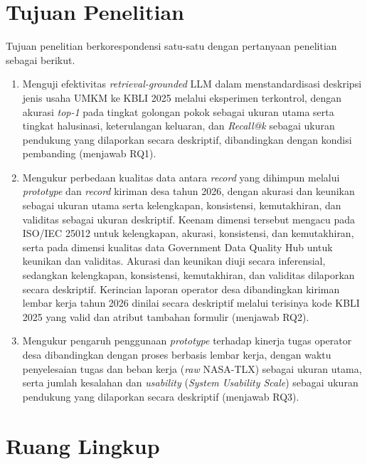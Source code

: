 \section{Tujuan Penelitian}
\label{sec:tujuan}

Tujuan penelitian berkorespondensi satu-satu dengan pertanyaan penelitian sebagai berikut.

\begin{enumerate}[label=\textbf{T\arabic*}:, leftmargin=*]
  \item Menguji efektivitas \textit{retrieval-grounded} LLM dalam menstandardisasi deskripsi jenis usaha UMKM ke KBLI 2025 melalui eksperimen terkontrol, dengan akurasi \textit{top-1} pada tingkat golongan pokok sebagai ukuran utama serta tingkat halusinasi, keterulangan keluaran, dan \textit{Recall@k} sebagai ukuran pendukung yang dilaporkan secara deskriptif, dibandingkan dengan kondisi pembanding (menjawab RQ1).
  \item Mengukur perbedaan kualitas data antara \textit{record} yang dihimpun melalui \textit{prototype} dan \textit{record} kiriman desa tahun 2026, dengan akurasi dan keunikan sebagai ukuran utama serta kelengkapan, konsistensi, kemutakhiran, dan validitas sebagai ukuran deskriptif. Keenam dimensi tersebut mengacu pada ISO/IEC 25012 \cite{iso25012} untuk kelengkapan, akurasi, konsistensi, dan kemutakhiran, serta pada dimensi kualitas data Government Data Quality Hub \cite{govuk2021dqdimensions} untuk keunikan dan validitas. Akurasi dan keunikan diuji secara inferensial, sedangkan kelengkapan, konsistensi, kemutakhiran, dan validitas dilaporkan secara deskriptif. Kerincian laporan operator desa dibandingkan kiriman lembar kerja tahun 2026 dinilai secara deskriptif melalui terisinya kode KBLI 2025 yang valid dan atribut tambahan formulir (menjawab RQ2).
  \item Mengukur pengaruh penggunaan \textit{prototype} terhadap kinerja tugas operator desa dibandingkan dengan proses berbasis lembar kerja, dengan waktu penyelesaian tugas dan beban kerja (\textit{raw} NASA-TLX) sebagai ukuran utama, serta jumlah kesalahan dan \textit{usability} (\textit{System Usability Scale}) sebagai ukuran pendukung yang dilaporkan secara deskriptif (menjawab RQ3).
\end{enumerate}

\section{Ruang Lingkup}
\label{sec:ruang-lingkup}

